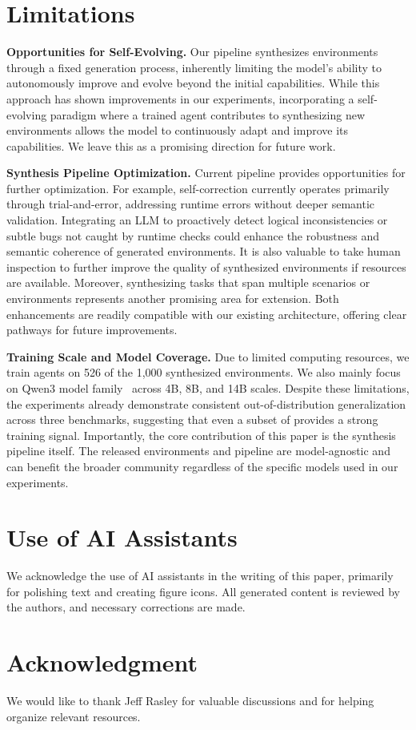 \documentclass{article}
\theoremstyle{plain}
\theoremstyle{definition}
\theoremstyle{remark}
\newcommand{\synth}{\textls{\textsc{AWM}}\xspace}
\newcommand{\myparagraph}[1]{\noindent\textbf{#1}}
\begin{document}
\section*{Limitations}

\myparagraph{Opportunities for Self-Evolving.}
Our \synth pipeline synthesizes environments through a fixed generation process, inherently limiting the model's ability to autonomously improve and evolve beyond the initial capabilities.
While this approach has shown improvements in our experiments, incorporating a self-evolving paradigm where a trained agent contributes to synthesizing new environments allows the model to continuously adapt and improve its capabilities. We leave this as a promising direction for future work.

\myparagraph{Synthesis Pipeline Optimization.}
Current \synth pipeline provides opportunities for further optimization.
For example, self-correction currently operates primarily through trial-and-error, addressing runtime errors without deeper semantic validation. Integrating an LLM to proactively detect logical inconsistencies or subtle bugs not caught by runtime checks could enhance the robustness and semantic coherence of generated environments. It is also valuable to take human inspection to further improve the quality of synthesized environments if resources are available.
Moreover, synthesizing tasks that span multiple scenarios or environments represents another promising area for extension. Both enhancements are readily compatible with our existing architecture, offering clear pathways for future improvements.

\myparagraph{Training Scale and Model Coverage.}
Due to limited computing resources, we train agents on 526 of the 1,000 synthesized environments.
We also mainly focus on Qwen3 model family~\citep{qwen3} across 4B, 8B, and 14B scales.
Despite these limitations, the experiments already demonstrate consistent out-of-distribution generalization across three benchmarks, suggesting that even a subset of \synth provides a strong training signal.
Importantly, the core contribution of this paper is the synthesis pipeline itself. The released environments and pipeline are model-agnostic and can benefit the broader community regardless of the specific models used in our experiments.


\section*{Use of AI Assistants}
We acknowledge the use of AI assistants in the writing of this paper, primarily for polishing text and creating figure icons.  
All generated content is reviewed by the authors, and necessary corrections are made.


\section*{Acknowledgment}
We would like to thank Jeff Rasley for valuable discussions and for helping organize relevant resources.






\end{document}
